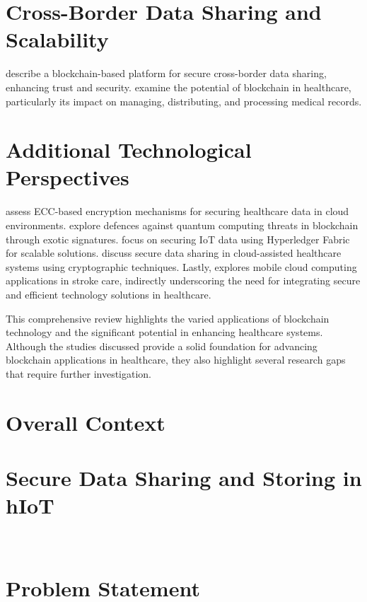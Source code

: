 \documentclass[cic,tc,english]{iiufrgs}
\begin{document}
    \section{Cross-Border Data Sharing and Scalability} 
        \citet{Rahman2020} describe a blockchain-based platform for secure cross-border data sharing, enhancing trust and security. \citet{Saeed2022} examine the potential of blockchain in healthcare, particularly its impact on managing, distributing, and processing medical records.
    
    \section{Additional Technological Perspectives} 
        \citet{Hema2019} assess ECC-based encryption mechanisms for securing healthcare data in cloud environments. \citet{Naz2024} explore defences against quantum computing threats in blockchain through exotic signatures. \citet{Eghmazi2024} focus on securing IoT data using Hyperledger Fabric for scalable solutions. \citet{XuChang2019} discuss secure data sharing in cloud-assisted healthcare systems using cryptographic techniques. Lastly, \citet{Karaca2019} explores mobile cloud computing applications in stroke care, indirectly underscoring the need for integrating secure and efficient technology solutions in healthcare.

    This comprehensive review highlights the varied applications of blockchain technology and the significant potential in enhancing healthcare systems. Although the studies discussed provide a solid foundation for advancing blockchain applications in healthcare, they also highlight several research gaps that require further investigation.

    \section{Overall Context}
        \label{sec:overallcontext}

    \section{Secure Data Sharing and Storing in hIoT}
        \label{sec:securedata}\

    \section{Problem Statement}
        \label{sec:problemstatement}
\end{document}
